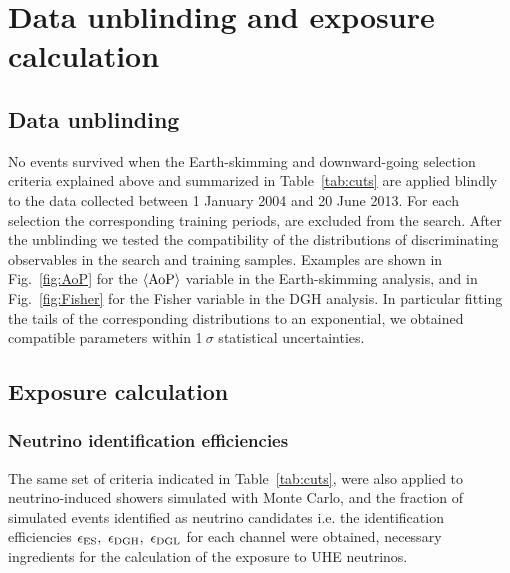 \documentclass[reprint,showpacs,showkeys,amsmath,amssymb,aps,nofootinbib]{revtex4-1}
\begin{document}
\section{Data unblinding and exposure calculation}

\subsection{Data unblinding}

No events survived when the Earth-skimming and downward-going selection criteria
explained above and summarized in Table~\ref{tab:cuts} are applied 
blindly to the data collected between 1 January 2004 and 20 June 2013.
For each selection the corresponding training periods, are excluded
from the search. 
After the unblinding we tested the compatibility of the distributions
of discriminating observables in the search and training samples. 
Examples are shown in Fig.~\ref{fig:AoP} for the $\langle{\rm AoP}\rangle$
variable in the Earth-skimming analysis, and in Fig.~\ref{fig:Fisher} for the 
Fisher variable in the DGH analysis. In particular
fitting the tails of the corresponding distributions to an exponential,
we obtained compatible parameters within 1$~\sigma$ statistical uncertainties. 

\subsection{Exposure calculation}

\subsubsection{Neutrino identification efficiencies}

The same set of criteria indicated 
in Table~\ref{tab:cuts}, were also applied to neutrino-induced showers
simulated with Monte Carlo, and the fraction of simulated events
identified as neutrino candidates i.e. the identification efficiencies
$\epsilon_{\rm ES},~\epsilon_{\rm DGH},~\epsilon_{\rm DGL}$ for 
each channel were obtained, necessary ingredients
for the calculation of the exposure to UHE neutrinos.   
\end{document}
